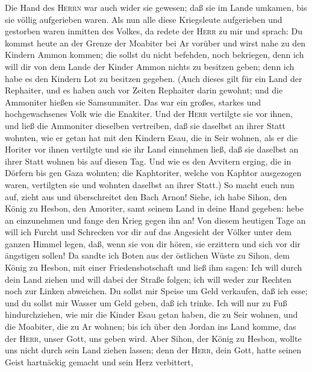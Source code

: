  Die Hand des \textsc{Herrn} war auch wider sie gewesen;
daß sie im Lande umkamen, bis sie völlig aufgerieben waren.
 Als nun alle diese Kriegsleute aufgerieben und gestorben
waren inmitten des Volkes,  da redete der \textsc{Herr}
zu mir und sprach:  Du kommst heute an der Grenze der
Moabiter bei Ar vorüber  und wirst nahe zu den Kindern
Ammon kommen; die sollst du nicht befehden, noch bekriegen, denn ich
will dir von dem Lande der Kinder Ammon nichts zu besitzen geben; denn
ich habe es den Kindern Lot zu besitzen gegeben.  (Auch
dieses gilt für ein Land der Rephaiter, und es haben auch vor Zeiten
Rephaiter darin gewohnt; und die Ammoniter hießen sie Samsummiter.
 Das war ein großes, starkes und hochgewachsenes Volk wie
die Enakiter. Und der \textsc{Herr} vertilgte sie vor ihnen, und ließ
die Ammoniter dieselben vertreiben, daß sie daselbst an ihrer Statt
wohnten,  wie er getan hat mit den Kindern Esau, die in
Seir wohnen, als er die Horiter vor ihnen vertilgte und sie ihr Land
einnehmen ließ, daß sie daselbst an ihrer Statt wohnen bis auf diesen
Tag.  Und wie es den Avvitern erging, die in Dörfern bis
gen Gaza wohnten; die Kaphtoriter, welche von Kaphtor ausgezogen waren,
vertilgten sie und wohnten daselbst an ihrer Statt.)  So
macht euch nun auf, zieht aus und überschreitet den Bach Arnon! Siehe,
ich habe Sihon, den König zu Hesbon, den Amoriter, samt seinem Land in
deine Hand gegeben: hebe an einzunehmen und fange den Krieg gegen ihn
an!  Von diesem heutigen Tage an will ich Furcht und
Schrecken vor dir auf das Angesicht der Völker unter dem ganzen Himmel
legen, daß, wenn sie von dir hören, sie erzittern und sich vor dir
ängstigen sollen!  Da sandte ich Boten aus der östlichen
Wüste zu Sihon, dem König zu Hesbon, mit einer Friedensbotschaft und
ließ ihm sagen:  Ich will durch dein Land ziehen und will
dabei der Straße folgen; ich will weder zur Rechten noch zur Linken
abweichen.  Du sollst mir Speise um Geld verkaufen, daß
ich esse; und du sollst mir Wasser um Geld geben, daß ich trinke. Ich
will nur zu Fuß hindurchziehen,  wie mir die Kinder Esau
getan haben, die zu Seir wohnen, und die Moabiter, die zu Ar wohnen; bis
ich über den Jordan ins Land komme, das der \textsc{Herr}, unser Gott,
uns geben wird.  Aber Sihon, der König zu Hesbon, wollte
uns nicht durch sein Land ziehen lassen; denn der \textsc{Herr}, dein
Gott, hatte seinen Geist hartnäckig gemacht und sein Herz verbittert,
